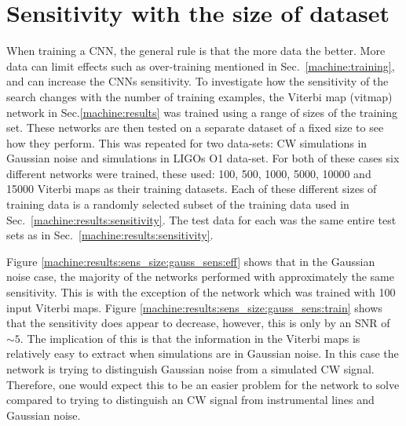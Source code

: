 \clearpage

\section{\label{machine:results:sens_size} Sensitivity with the size of dataset}

When training a \gls{CNN}, the general rule is that the more data the better. 
More data can limit effects such as over-training mentioned in Sec.~\ref{machine:training}, and can increase the \glspl{CNN} sensitivity.
To investigate how the sensitivity of the search changes with the number of training examples, the Viterbi map (vitmap) network in Sec.\ref{machine:results} was trained using a range of sizes of the training set. 
These networks are then tested on a separate dataset of a fixed size to see how they perform.
This was repeated for two data-sets: \gls{CW} simulations in Gaussian noise and simulations in \glspl{LIGO} O1 data-set. 
For both of these cases six different networks were trained, these used: 100, 500, 1000, 5000, 10000 and 15000 Viterbi maps as their training datasets.
Each of these different sizes of training data is a randomly selected subset of the training data used in Sec.~\ref{machine:results:sensitivity}.
The test data for each was the same entire test sets as in Sec.~\ref{machine:results:sensitivity}.

Figure \ref{machine:results:sens_size:gauss_sens:eff} shows that in the Gaussian noise case, the majority of the networks performed with approximately the same sensitivity. 
This is with the exception of the network which was trained with 100 input Viterbi maps. 
Figure \ref{machine:results:sens_size:gauss_sens:train} shows that the sensitivity does appear to decrease, however, this is only by an \gls{SNR} of $\sim 5$.
The implication of this is that the information in the Viterbi maps is relatively easy to extract when simulations are in Gaussian noise. 
In this case the network is trying to distinguish Gaussian noise from a simulated \gls{CW} signal.
Therefore, one would expect this to be an easier problem for the network to solve compared to trying to distinguish an \gls{CW} signal from instrumental lines and Gaussian noise. 

